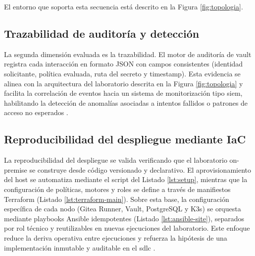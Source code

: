 \documentclass[runningheads]{llncs}
\begin{document}
El entorno que soporta esta secuencia está descrito en la Figura \ref{fig:topologia}.

\subsection{Trazabilidad de auditoría y detección}
La segunda dimensión evaluada es la trazabilidad. El motor de auditoría de \gls{vault} registra cada interacción en formato JSON con campos consistentes (identidad solicitante, política evaluada, ruta del secreto y timestamp). Esta evidencia se alinea con la arquitectura del laboratorio descrita en la Figura \ref{fig:topologia} y facilita la correlación de eventos hacia un sistema de monitorización tipo \gls{siem}, habilitando la detección de anomalías asociadas a intentos fallidos o patrones de acceso no esperados \parencite{vault_audit_devices,nist_sp800_207}.

\subsection{Reproducibilidad del despliegue mediante IaC}
La reproducibilidad del despliegue se valida verificando que el laboratorio on-premise se construye desde código versionado y declarativo. El aprovisionamiento del host se automatiza mediante el script del Listado \ref{lst:setup}, mientras que la configuración de políticas, motores y roles se define a través de manifiestos Terraform (Listado \ref{lst:terraform-main}). Sobre esta base, la configuración específica de cada nodo (Gitea Runner, Vault, PostgreSQL y K3s) se orquesta mediante playbooks Ansible idempotentes (Listado \ref{lst:ansible-site}), separados por rol técnico y reutilizables en nuevas ejecuciones del laboratorio. Este enfoque reduce la deriva operativa entre ejecuciones y refuerza la hipótesis de una implementación inmutable y auditable en el \gls{sdlc} \parencite{terraform_documentation}.
\end{document}
